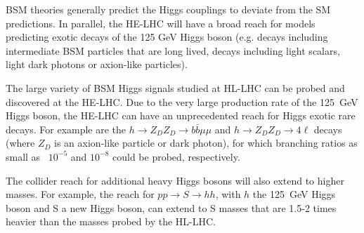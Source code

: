 \documentclass[../report.tex]{subfiles}
\begin{document}
BSM theories generally predict the Higgs couplings to deviate from the SM predictions. In parallel, the HE-LHC will have a broad reach for models predicting exotic decays of the 125 GeV Higgs boson (e.g. decays including intermediate BSM particles that are long lived, decays including light scalars, light dark photons or axion-like particles). 

The large variety of BSM Higgs signals studied at HL-LHC can be probed and discovered at the HE-LHC. Due to the very large production rate of the 125~GeV Higgs boson, the HE-LHC can have an unprecedented reach for Higgs exotic rare decays. For example are the $h \rightarrow Z_D Z_D \rightarrow b\overline{b}\mu\mu$ and $h \rightarrow  Z_D Z_D \rightarrow 4\ell$ decays (where $Z_D$ is an axion-like particle or dark photon), for which branching ratios as small as ~$10^{-5}$ and $10^{-8}$ could be probed, respectively.

The collider reach for additional heavy Higgs bosons will also extend to higher masses. For example, the reach for $pp \rightarrow S \rightarrow hh$, with $h$ the 125~GeV Higgs boson and S a new Higgs boson, can extend to S masses that are 1.5-2 times heavier than the masses probed by the HL-LHC.
\end{document}
